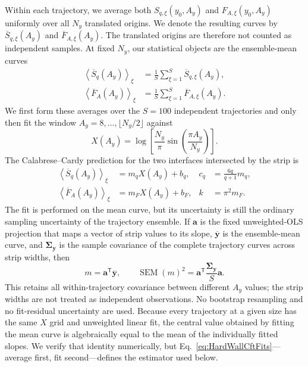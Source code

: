 \documentclass[aps,prb,twocolumn,superscriptaddress,longbibliography,floatfix]{revtex4-2}
\theoremstyle{plain}
\theoremstyle{definition}
\theoremstyle{remark}
\begin{document}
Within each trajectory, we average both $S_{q,\xi}(y_0,A_y)$ and
$F_{A,\xi}(y_0,A_y)$ uniformly over all $N_y$ translated origins.  We denote
the resulting curves by $\overline S_{q,\xi}(A_y)$ and
$\overline F_{A,\xi}(A_y)$.  The translated origins are therefore not counted
as independent samples.  At fixed $N_y$, our statistical objects are the
ensemble-mean curves
\begin{align}
 \left\langle\overline S_q(A_y)\right\rangle_\xi
 &=\frac{1}{S}\sum_{\xi=1}^S\overline S_{q,\xi}(A_y),
 \nonumber\\
 \left\langle\overline F_A(A_y)\right\rangle_\xi
 &=\frac{1}{S}\sum_{\xi=1}^S\overline F_{A,\xi}(A_y).
 \label{eq:HardWallMeanCurves}
\end{align}
We first form these averages over the $S=100$ independent trajectories and
only then fit the window $A_y=8,\ldots,\lfloor N_y/2\rfloor$ against
\begin{equation}
 X(A_y)=\log\!\left[\frac{N_y}{\pi}
 \sin\!\left(\frac{\pi A_y}{N_y}\right)\right].
 \label{eq:HardWallLogChord}
\end{equation}
The Calabrese--Cardy prediction for the two interfaces intersected by the
strip is~\cite{CalabreseCardy2004}
\begin{align}
 \left\langle\overline S_q(A_y)\right\rangle_\xi
 &=m_qX(A_y)+b_q,
 &c_q&=\frac{6q}{q+1}m_q,
 \nonumber\\
 \left\langle\overline F_A(A_y)\right\rangle_\xi
 &=m_FX(A_y)+b_F,
 &k&=\pi^2m_F.
 \label{eq:HardWallCftFits}
\end{align}
The fit is performed on the mean curve, but its uncertainty is still the
ordinary sampling uncertainty of the trajectory ensemble.  If $\mathbf a$ is
the fixed unweighted-OLS projection that maps a vector of strip values to its
slope, $\overline{\mathbf y}$ is the ensemble-mean curve, and
$\boldsymbol\Sigma_{\mathbf y}$ is the sample covariance of the complete
trajectory curves across strip widths, then
\begin{equation}
 m=\mathbf a^{\mathsf T}\overline{\mathbf y},\qquad
 \operatorname{SEM}(m)^2=
 \mathbf a^{\mathsf T}\frac{\boldsymbol\Sigma_{\mathbf y}}{S}\mathbf a.
 \label{eq:HardWallMeanCurveSem}
\end{equation}
This retains all within-trajectory covariance between different $A_y$ values;
the strip widths are not treated as independent observations.  No bootstrap
resampling and no fit-residual uncertainty are used.  Because every
trajectory at a given size has the same $X$ grid and unweighted linear fit,
the central value obtained by fitting the mean curve is algebraically equal
to the mean of the individually fitted slopes.  We verify that identity
numerically, but Eq.~\eqref{eq:HardWallCftFits}---average first, fit
second---defines the estimator used below.
\end{document}
